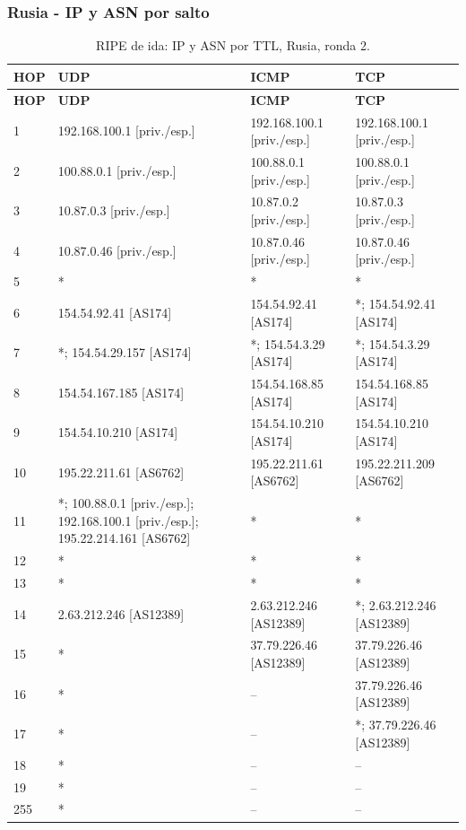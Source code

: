 \subsubsection{Rusia - IP y ASN por salto}
\begingroup
\fontsize{9}{11}\selectfont
\begin{longtable}{p{0.95cm}p{4.716666666666667cm}p{4.716666666666667cm}p{4.716666666666667cm}}
\caption{RIPE de ida: IP y ASN por TTL, Rusia, ronda 2.}\label{ripe:37.79.226.46} \\
\toprule
\textbf{HOP} & \textbf{UDP} & \textbf{ICMP} & \textbf{TCP} \\ \midrule
\endfirsthead
\toprule
\textbf{HOP} & \textbf{UDP} & \textbf{ICMP} & \textbf{TCP} \\ \midrule
\endhead
1 & 192.168.100.1 [priv./esp.] & 192.168.100.1 [priv./esp.] & 192.168.100.1 [priv./esp.] \\
2 & 100.88.0.1 [priv./esp.] & 100.88.0.1 [priv./esp.] & 100.88.0.1 [priv./esp.] \\
3 & 10.87.0.3 [priv./esp.] & 10.87.0.2 [priv./esp.] & 10.87.0.3 [priv./esp.] \\
4 & 10.87.0.46 [priv./esp.] & 10.87.0.46 [priv./esp.] & 10.87.0.46 [priv./esp.] \\
5 & * & * & * \\
6 & 154.54.92.41 [AS174] & 154.54.92.41 [AS174] & *; 154.54.92.41 [AS174] \\
7 & *; 154.54.29.157 [AS174] & *; 154.54.3.29 [AS174] & *; 154.54.3.29 [AS174] \\
8 & 154.54.167.185 [AS174] & 154.54.168.85 [AS174] & 154.54.168.85 [AS174] \\
9 & 154.54.10.210 [AS174] & 154.54.10.210 [AS174] & 154.54.10.210 [AS174] \\
10 & 195.22.211.61 [AS6762] & 195.22.211.61 [AS6762] & 195.22.211.209 [AS6762] \\
11 & *; 100.88.0.1 [priv./esp.]; 192.168.100.1 [priv./esp.]; 195.22.214.161 [AS6762] & * & * \\
12 & * & * & * \\
13 & * & * & * \\
14 & 2.63.212.246 [AS12389] & 2.63.212.246 [AS12389] & *; 2.63.212.246 [AS12389] \\
15 & * & 37.79.226.46 [AS12389] & 37.79.226.46 [AS12389] \\
16 & * & -- & 37.79.226.46 [AS12389] \\
17 & * & -- & *; 37.79.226.46 [AS12389] \\
18 & * & -- & -- \\
19 & * & -- & -- \\
255 & * & -- & -- \\
\bottomrule
\end{longtable}
